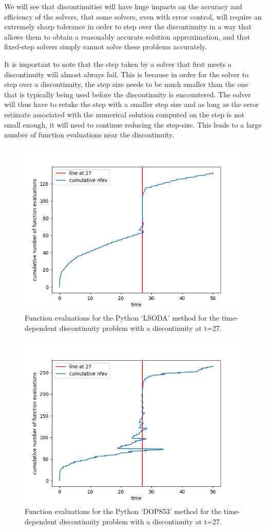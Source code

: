 We will see that discontinuities will have huge impacts on the accuracy and efficiency of the solvers, that some solvers, even with error control, will require an extremely sharp tolerance in order to step over the discontinuity in a way that allows them to obtain a reasonably accurate solution approximation, and that fixed-step solvers simply cannot solve these problems accurately. 

It is important to note that the step taken by a solver that first meets a discontinuity will almost always fail. This is because in order for the solver to step over a discontinuity, the step size needs to be much smaller than the one that is typically being used before the discontinuity is encountered. The solver will thus have to retake the step with a smaller step size and as long as the error estimate associated with the numerical solution computed on the step is not small enough, it will need to continue reducing the step-size. This leads to a large number of function evaluations near the discontinuity. 

\begin{figure}[h]
\centering
\includegraphics[width=0.7\linewidth]{./figures/lsoda_vs_discontinuity}
\caption{Function evaluations for the Python `LSODA' method for the time-dependent discontinuity problem with a discontinuity at t=27.}
\label{fig:lsoda_vs_discontinuity}
\end{figure}

\begin{figure}[h]
\centering
\includegraphics[width=0.7\linewidth]{./figures/dop853_vs_discontinuity}
\caption{Function evaluations for the Python `DOP853' method for the time-dependent discontinuity problem with a discontinuity at t=27.}
\label{fig:dop853_vs_discontinuity}
\end{figure}

